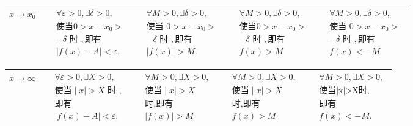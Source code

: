 \documentclass[12pt, a4paper, oneside, UTF8]{ctexbook}
\begin{document}
\begin{sloppypar}
\begin{center}
\begin{supertabular}{|c|c|c|c|c|}
            $x \to x_0^-$     & $\begin{aligned}&\forall\varepsilon>0,\exists\delta>0, \\&\text{使当}0>x-x_{0}> \\&-\delta\text{ 时 },\text{即有} \\&|f(x)-A|<\varepsilon.\end{aligned}$         & $\begin{aligned}&\forall M>0,\exists\delta>0, \\&\text{使当 }0>x-x_{0}> \\&-\delta\text{ 时 },\text{即有} \\&|f(x)|>M.\end{aligned}$         & $\begin{aligned}&\forall M>0,\exists\delta>0, \\&\text{使当}0>x-x_{0}> \\&-\delta\text{ 时 },\text{即有}\\& f(x) >M\end{aligned}$ & $\begin{aligned}&\forall M>0,\exists\delta>0, \\&\text{使当 }0>x-x_{0}> \\&-\delta\text{ 时 },\text{即有}\\&f(x) <-M\end{aligned}$    \\ \hline
        \end{supertabular}
        \begin{supertabular}{|c|c|c|c|c|}
            \hline
            $x\to \infty$     & $\begin{aligned}&\forall\varepsilon>0,\exists X>0, \\&\text{使当}\mid x\mid>X\text{ 时 }, \\&\text{即有} \\&|f(x)-A|<\varepsilon.\end{aligned}$                  & $\begin{aligned}&\forall M>0,\exists X>0,\\& \text{使当}\mid x\mid>X \\&\text{时,即有}\\&|f(x)|>M\end{aligned}$                              & $\begin{aligned}&\forall M>0,\exists X>0, \\&\text{使当}\mid x\mid>X \\&\text{时,即有}\\& f(x)>M\end{aligned}$                    & $\begin{aligned}&\forall M>0,\exists X>0, \\&\text{使当|x|>X时,} \\&\text{即有} \\&f(x)<-M.\end{aligned}$                             \\ \hline

\end{supertabular}
\end{center}
\end{sloppypar}
\end{document}
